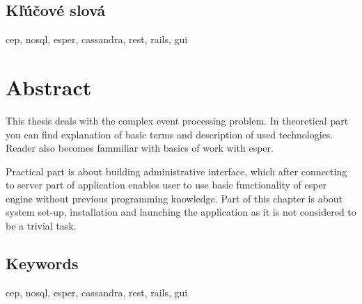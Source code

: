 \documentclass[12pt, a4paper, oneside]{book} %
\begin{document}
\section*{Kľúčové slová}
cep, nosql, esper, cassandra, rest, rails, gui \emptydoublepage

\chapter*{Abstract}
This thesis deals with the complex event processing problem. In theoretical part you can find explanation of basic terms and description of used technologies. Reader also becomes fammiliar with basics of work with esper.

Practical part is about building administrative interface, which after connecting to server part of application enables user to use basic functionality of esper engine without previous programming knowledge. Part of this chapter is about system set-up, installation and launching the application as it is not considered to be a trivial task.

\section*{Keywords}
cep, nosql, esper, cassandra, rest, rails, gui \emptydoublepage

\tableofcontents \emptydoublepage

\mainmatter

%










\backmatter

	\emptydoublepage

\listoffigures \emptydoublepage
\listoftables
\end{document}
